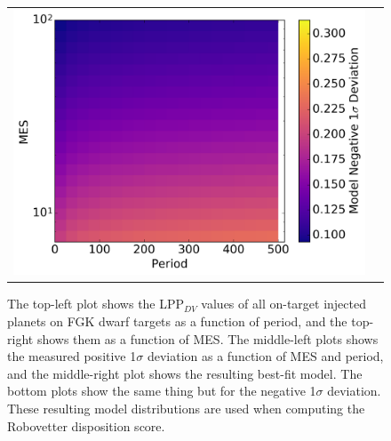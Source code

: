 \begin{figure}
\begin{tabular}{cc}
\includegraphics[width=0.5\linewidth]{ScoreFig-6.png}
\end{tabular}
\caption{The top-left plot shows the LPP$_{DV}$ values of all on-target injected planets on FGK dwarf targets as a function of period, and the top-right shows them as a function of MES. The middle-left plots shows the measured positive 1$\sigma$ deviation as a function of MES and period, and the middle-right plot shows the resulting best-fit model. The bottom plots show the same thing but for the negative 1$\sigma$ deviation. These resulting model distributions are used when computing the Robovetter disposition score.}
\label{score-fig-1}
\end{figure}
